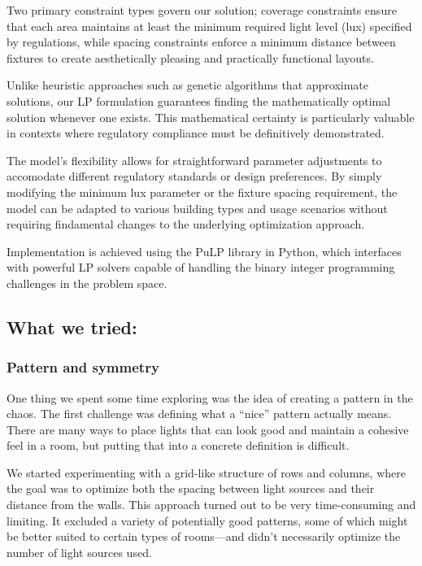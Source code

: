 \documentclass{article}
\begin{document}
Two primary constraint types govern our solution; coverage constraints ensure that each area maintains at least the minimum required light level 
(lux) specified by regulations, while spacing constraints enforce a minimum distance between fixtures to create aesthetically pleasing and 
practically functional layouts. 

Unlike heuristic approaches such as genetic algorithms that approximate solutions, our LP formulation guarantees finding the mathematically optimal 
solution whenever one exists. This mathematical certainty is particularly valuable in contexts where regulatory compliance must be definitively
demonstrated. 

The model's flexibility allows for straightforward parameter adjustments to accomodate different regulatory standards or design preferences. 
By simply modifying the minimum lux parameter or the fixture spacing requirement, the model can be adapted to various building types and usage 
scenarios without requiring findamental changes to the underlying optimization approach.

Implementation is achieved using the PuLP library in Python, which interfaces with powerful LP solvers capable of handling the binary 
integer programming challenges in the problem space.


\subsection{What we tried: }

\subsubsection{Pattern and symmetry}
One thing we spent some time exploring was the idea of creating a pattern in the chaos. The first challenge was defining what a “nice” pattern actually means. There are many ways to place lights that can look good and maintain a cohesive feel in a room, but putting that into a concrete definition is difficult.

We started experimenting with a grid-like structure of rows and columns, where the goal was to optimize both the spacing between light sources and their distance from the walls. This approach turned out to be very time-consuming and limiting. It excluded a variety of potentially good patterns, some of which might be better suited to certain types of rooms—and didn’t necessarily optimize the number of light sources used.
\end{document}
